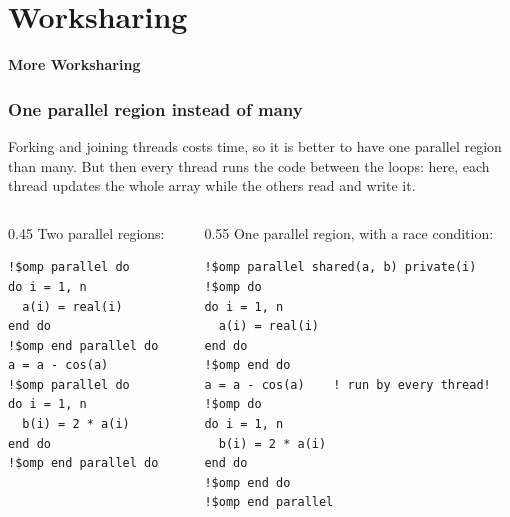 \section{Worksharing}

\begin{frame}
  \centering
  \Huge \textbf{More Worksharing}
\end{frame}


\begin{frame}[fragile]
  \frametitle{One parallel region instead of many}
  Forking and joining threads costs time, so it is better to have one parallel region than many. But then every thread runs the code between the loops: here, each thread updates the whole array while the others read and write it.

  \vspace*{1mm}
  \begin{columns}[T]
    \begin{column}{0.45\textwidth}
      Two parallel regions:
      \begin{lstlisting}
!$omp parallel do
do i = 1, n
  a(i) = real(i)
end do
!$omp end parallel do
a = a - cos(a)
!$omp parallel do
do i = 1, n
  b(i) = 2 * a(i)
end do
!$omp end parallel do
      \end{lstlisting}
    \end{column}

    \begin{column}{0.55\textwidth}
      One parallel region, with a race condition:
      \begin{lstlisting}
!$omp parallel shared(a, b) private(i)
!$omp do
do i = 1, n
  a(i) = real(i)
end do
!$omp end do
a = a - cos(a)    ! run by every thread!
!$omp do
do i = 1, n
  b(i) = 2 * a(i)
end do
!$omp end do
!$omp end parallel
      \end{lstlisting}
    \end{column}
  \end{columns}
\end{frame}


